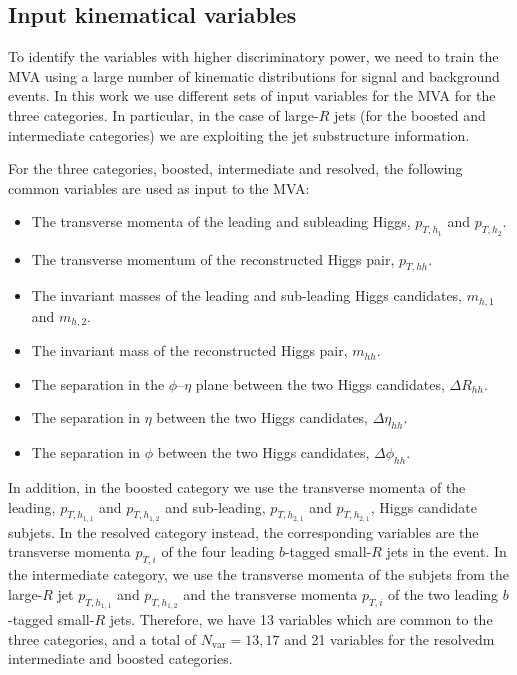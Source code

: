  

 \subsection{Input kinematical variables}
 \label{sec:input}

 To identify the variables with higher discriminatory power,
 we need to train
 the MVA using a large number of kinematic distributions for
 signal and background events.
%
In this work we use different sets of
input variables for the MVA for the three categories.
%
In particular, in the case of large-$R$ jets (for the boosted
and intermediate categories) we are exploiting the jet
substructure information.

For the three categories, boosted, intermediate and resolved,
the following common variables are used as input to the MVA:
\begin{itemize}
\item The transverse momenta of the leading and subleading Higgs, $p_{T,h_1}$ and $p_{T,h_2}$.
\item The transverse momentum of the reconstructed Higgs pair, $p_{T,hh}$.
\item The invariant masses of the leading and sub-leading Higgs candidates, $m_{h,1}$ and $m_{h,2}$.
\item The invariant mass of the reconstructed Higgs pair, $m_{hh}$.
\item The separation in the $\phi$--$\eta$ plane
  between the two Higgs candidates, $\Delta R_{hh}$.
  \item The separation in $\eta$  between the two Higgs candidates, $\Delta \eta_{hh}$.
\item The separation in $\phi$  between the two Higgs candidates, $\Delta \phi_{hh}$.
\end{itemize}
In addition, in the boosted category we use
  the transverse momenta of the leading, $p_{T,h_{1,1}}$ and $p_{T,h_{1,2}}$ and
  sub-leading, $p_{T,h_{2,1}}$ and $p_{T,h_{2,1}}$, Higgs candidate subjets.
  In the resolved category instead,
  the corresponding variables are
  the transverse momenta $p_{T,i}$ of the four leading 
  $b$-tagged small-$R$ jets in the event.
  In the intermediate category, we use the
  transverse momenta of the subjets
  from the large-$R$ jet $p_{T,h_{1,1}}$ and $p_{T,h_{1,2}}$ and the
 transverse momenta $p_{T,i}$ of the two leading 
  $b$-tagged small-$R$ jets.
 Therefore, we have 13 variables which are common to the three categories,
 and a total of $N_{\mathrm{var}}=13,17$ and 21 variables for the
resolvedm intermediate and boosted categories.


